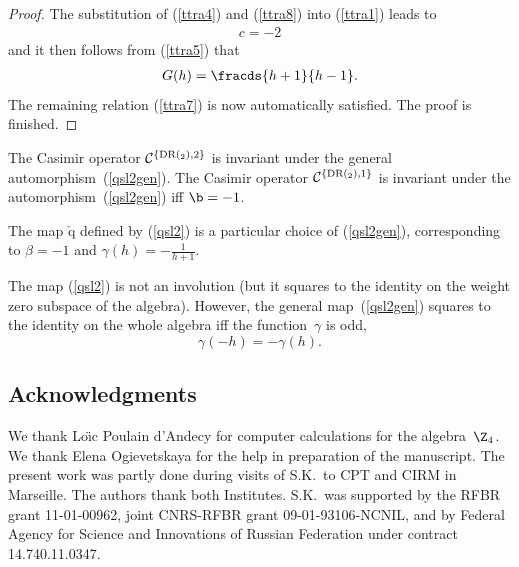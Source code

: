 \documentclass[pdftex]{sigma}
\def\lb{\label}\def\lcd{\ts,\ldots,}\def\mult{\diamond}\def\n{\mathfrak{n}}\def\nminus{\mathfrak{n}_-}
\def\q{\check{\mathrm q}}\def\Q{\mathrm{Q}}\def\r#1{(\ref{#1})}\let\rf=\r
\numberwithin{equation}{section}
\begin{document}
\begin{proof}
The substitution of \rf{ttra4} and \rf{ttra8} into \rf{ttra1} leads to
\begin{gather*} c=-2%
\end{gather*}
and it then follows from \rf{ttra5} that
\begin{gather*}
G(h)=\fracds{h+1}{h-1}  .%
\end{gather*}
The remaining relation \rf{ttra7} is now automatically satisf\/ied. The proof is f\/inished.
\end{proof}


The Casimir operator ${\mathcal{C}}^{\{ {\mathrm{DR}}(\sl_2),2\} } $ is invariant under the general automorphism~\rf{qsl2gen}.
The Casimir operator ${\mathcal{C}}^{\{ {\mathrm{DR}}(\sl_2),1\} } $ is invariant under the automorphism~\rf{qsl2gen} if\/f $\b =-1$.


The map $\q$ def\/ined by (\ref{qsl2}) is a particular choice of (\ref{qsl2gen}), corresponding to $\beta =-1$ and $\gamma (h)=-\frac{1}{h+1}$.


The map (\ref{qsl2}) is not an involution (but it squares to the identity on the weight zero subspace of the algebra). However, the general map~(\ref{qsl2gen}) squares
to the identity on the whole algebra if\/f the function~$\gamma$ is odd,
\[ \gamma (-h)=-\gamma (h) .%
\]

\subsection*{Acknowledgments}

We thank Lo\"{\i}c Poulain d'Andecy for computer calculations for the  algebra~$\Z_4$. We thank Elena Ogievetskaya for the help in preparation
of the manuscript.
The present work was partly done during visits of S.K.\ to CPT and CIRM in Marseille. The authors thank both Institutes. S.K.\ was
supported by the RFBR grant 11-01-00962,  joint CNRS-RFBR grant 09-01-93106-NCNIL,
and by Federal Agency for Science and Innovations of Russian Federation under contract
14.740.11.0347.

\end{document}
